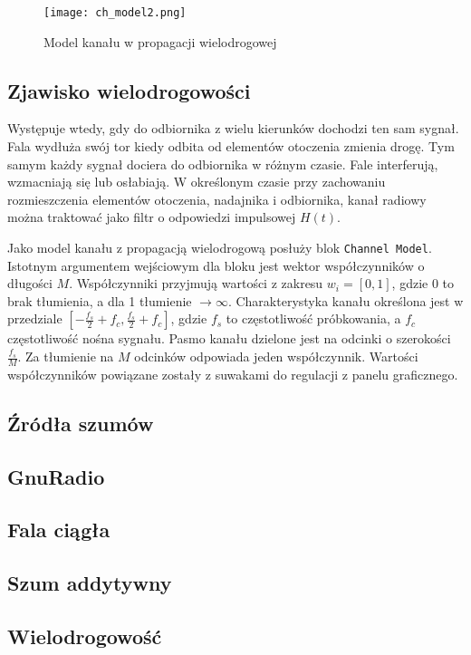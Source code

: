 \begin{figure}[ht]
\centering
\texttt{[image: ch\_model2.png]}
\caption{Model kanału w propagacji wielodrogowej}
\label{mpathmodel}
\end{figure}

\subsection{Zjawisko wielodrogowości}
Występuje wtedy, gdy do odbiornika z wielu kierunków dochodzi ten sam sygnał. 
Fala wydłuża swój tor kiedy odbita od elementów otoczenia zmienia drogę. 
Tym samym każdy sygnał dociera do odbiornika w różnym czasie. 
Fale interferują, wzmacniają się lub osłabiają. 
W określonym czasie przy zachowaniu rozmieszczenia elementów otoczenia, nadajnika i odbiornika, kanał radiowy można traktować jako filtr o odpowiedzi impulsowej $H(t)$.

Jako model kanału z propagacją wielodrogową posłuży blok \texttt{Channel Model}. 
Istotnym argumentem wejściowym dla bloku jest wektor współczynników o długości $M$. Współczynniki przyjmują wartości z zakresu $w_i = [0,1]$, gdzie 0 to brak tłumienia, a dla 1 tłumienie $\to \infty$. Charakterystyka kanału określona jest w przedziale $[-\frac{f_s}{2} + f_c,\frac{f_s}{2} + f_c]$, gdzie $f_s$ to częstotliwość próbkowania, a $f_c$ częstotliwość nośna sygnału. Pasmo kanału dzielone jest na odcinki o szerokości $\frac{f_s}{M}$. Za tłumienie na  $M$ odcinków odpowiada jeden współczynnik. Wartości współczynników powiązane zostały z suwakami do regulacji z panelu graficznego. 


\subsection{Źródła szumów}
\subsection{GnuRadio}
\subsection{Fala ciągła}
\subsection{Szum addytywny}
\subsection{Wielodrogowość}
